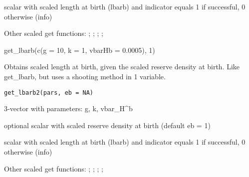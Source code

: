 \documentclass[a4paper]{book}
\begin{document}
%
\begin{Value}
scalar with scaled length at birth (lbarb) and indicator equals 1 if successful, 0 otherwise (info)
\end{Value}
%
\begin{SeeAlso}\relax
Other scaled get functions: ;
; ;
;
\end{SeeAlso}
%
\begin{Examples}
\begin{ExampleCode}
get_lbarb(c(g = 10, k = 1, vbarHb = 0.0005), 1)
\end{ExampleCode}
\end{Examples}
%
\begin{Description}\relax
Obtains scaled length at birth, given the scaled reserve density at birth. Like get\_lbarb, but uses a shooting method in 1 variable.
\end{Description}
%
\begin{Usage}
\begin{verbatim}
get_lbarb2(pars, eb = NA)
\end{verbatim}
\end{Usage}
%
\begin{Arguments}
\begin{ldescription}
\item[\code{pars}] 3-vector with parameters: g, k, vbar\_H\textasciicircum{}b

\item[\code{eb}] optional scalar with scaled reserve density at birth (default eb = 1)
\end{ldescription}
\end{Arguments}
%
\begin{Value}
scalar with scaled length at birth (lbarb) and indicator equals 1 if successful, 0 otherwise (info)
\end{Value}
%
\begin{SeeAlso}\relax
Other scaled get functions: ;
; ;
;
\end{SeeAlso}
%
\end{document}
